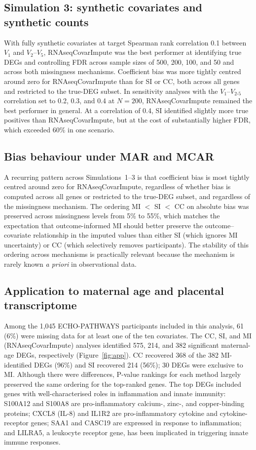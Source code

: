 \documentclass[11pt]{article}
\begin{document}
\subsection{Simulation 3: synthetic covariates and synthetic counts}

With fully synthetic covariates at target Spearman rank correlation 0.1 between $V_1$ and $V_2$--$V_5$, RNAseqCovarImpute was the best performer at identifying true DEGs and controlling FDR across sample sizes of 500, 200, 100, and 50 and across both missingness mechanisms. Coefficient bias was more tightly centred around zero for RNAseqCovarImpute than for SI or CC, both across all genes and restricted to the true-DEG subset. In sensitivity analyses with the $V_1$--$V_{2\text{-}5}$ correlation set to 0.2, 0.3, and 0.4 at $N=200$, RNAseqCovarImpute remained the best performer in general. At a correlation of 0.4, SI identified slightly more true positives than RNAseqCovarImpute, but at the cost of substantially higher FDR, which exceeded 60\% in one scenario.

\subsection{Bias behaviour under MAR and MCAR}

A recurring pattern across Simulations~1--3 is that coefficient bias is most tightly centred around zero for RNAseqCovarImpute, regardless of whether bias is computed across all genes or restricted to the true-DEG subset, and regardless of the missingness mechanism. The ordering MI $<$ SI $<$ CC on absolute bias was preserved across missingness levels from 5\% to 55\%, which matches the expectation that outcome-informed MI should better preserve the outcome--covariate relationship in the imputed values than either SI (which ignores MI uncertainty) or CC (which selectively removes participants). The stability of this ordering across mechanisms is practically relevant because the mechanism is rarely known \emph{a priori} in observational data.

\subsection{Application to maternal age and placental transcriptome}

Among the 1,045 ECHO-PATHWAYS participants included in this analysis, 61 (6\%) were missing data for at least one of the ten covariates. The CC, SI, and MI (RNAseqCovarImpute) analyses identified 575, 214, and 382 significant maternal-age DEGs, respectively (Figure~\ref{fig:app}). CC recovered 368 of the 382 MI-identified DEGs (96\%) and SI recovered 214 (56\%); 30 DEGs were exclusive to MI. Although there were differences, P-value rankings for each method largely preserved the same ordering for the top-ranked genes. The top DEGs included genes with well-characterised roles in inflammation and innate immunity: S100A12 and S100A8 are pro-inflammatory calcium-, zinc-, and copper-binding proteins; CXCL8 (IL-8) and IL1R2 are pro-inflammatory cytokine and cytokine-receptor genes; SAA1 and CASC19 are expressed in response to inflammation; and LILRA5, a leukocyte receptor gene, has been implicated in triggering innate immune responses.
\end{document}
